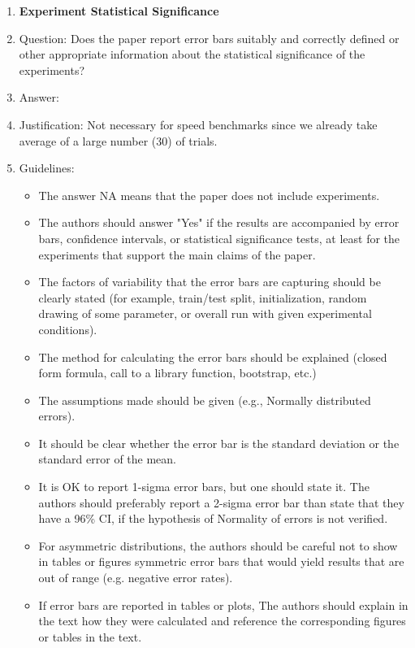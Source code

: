 \documentclass{article}
\begin{document}
{\begin{enumerate}
\item {\bf Experiment Statistical Significance}
    \item[] Question: Does the paper report error bars suitably and correctly defined or other appropriate information about the statistical significance of the experiments?
    \item[] Answer: \answerNo{} %
    \item[] Justification: Not necessary for speed benchmarks since we already
      take average of a large number (30) of trials.
    \item[] Guidelines:
    \begin{itemize}
        \item The answer NA means that the paper does not include experiments.
        \item The authors should answer "Yes" if the results are accompanied by error bars, confidence intervals, or statistical significance tests, at least for the experiments that support the main claims of the paper.
        \item The factors of variability that the error bars are capturing should be clearly stated (for example, train/test split, initialization, random drawing of some parameter, or overall run with given experimental conditions).
        \item The method for calculating the error bars should be explained (closed form formula, call to a library function, bootstrap, etc.)
        \item The assumptions made should be given (e.g., Normally distributed errors).
        \item It should be clear whether the error bar is the standard deviation or the standard error of the mean.
        \item It is OK to report 1-sigma error bars, but one should state it. The authors should preferably report a 2-sigma error bar than state that they have a 96\% CI, if the hypothesis of Normality of errors is not verified.
        \item For asymmetric distributions, the authors should be careful not to show in tables or figures symmetric error bars that would yield results that are out of range (e.g. negative error rates).
        \item If error bars are reported in tables or plots, The authors should explain in the text how they were calculated and reference the corresponding figures or tables in the text.
    \end{itemize}


\end{enumerate}}
\end{document}
